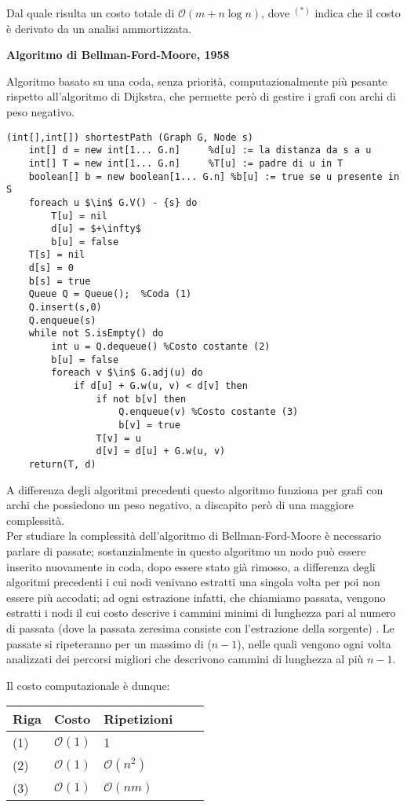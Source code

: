 \documentclass[../cheatSheetAlgoritmi.tex]{subfiles}
\begin{document}
\bigskip
Dal quale risulta un costo totale di $\mathcal{O}(m + n \log n)$, dove $^{(*)}$ indica che il costo è derivato da un analisi ammortizzata.
 
\begin{flushleft}
\textbf{Algoritmo di Bellman-Ford-Moore, 1958}
\end{flushleft}
Algoritmo basato su una coda, senza priorità, computazionalmente più pesante rispetto all'algoritmo di Dijkstra, che permette però di gestire i grafi con archi di peso negativo.
\begin{lstlisting}[caption=Algoritmo di Bellman-Ford-Moore: cammini minimi a sorgente singola]
(int[],int[]) shortestPath (Graph G, Node s)
	int[] d = new int[1... G.n]		%d[u] := la distanza da s a u 
	int[] T = new int[1... G.n]		%T[u] := padre di u in T
	boolean[] b = new boolean[1... G.n]	%b[u] := true se u presente in S 
	foreach u $\in$ G.V() - {s} do
		T[u] = nil
		d[u] = $+\infty$
		b[u] = false
	T[s] = nil
	d[s] = 0
	b[s] = true
	Queue Q = Queue();	%Coda (1)
	Q.insert(s,0)
	Q.enqueue(s)
	while not S.isEmpty() do 
		int u = Q.dequeue()	%Costo costante (2)
		b[u] = false
		foreach v $\in$ G.adj(u) do
			if d[u] + G.w(u, v) < d[v] then 
				if not b[v] then
					Q.enqueue(v) %Costo costante (3)
					b[v] = true
				T[v] = u 
				d[v] = d[u] + G.w(u, v)
	return(T, d)
\end{lstlisting}
A differenza degli algoritmi precedenti questo algoritmo funziona per grafi con archi che possiedono un peso negativo, a discapito però di una maggiore complessità. \\
Per studiare la complessità dell'algoritmo di Bellman-Ford-Moore è necessario parlare di passate; sostanzialmente in questo algoritmo un nodo può essere inserito nuovamente in coda, dopo essere stato già rimosso, a differenza degli algoritmi precedenti i cui nodi venivano estratti una singola volta per poi non essere più accodati; ad ogni estrazione infatti, che chiamiamo passata, vengono estratti i nodi il cui costo descrive i cammini minimi di lunghezza pari al numero di passata (dove la passata zeresima consiste con l'estrazione della sorgente) . Le passate si ripeteranno per un massimo di ($n-1$), nelle quali vengono ogni volta analizzati dei percorsi migliori che descrivono cammini di lunghezza al più $n - 1$. 

\bigskip
Il costo computazionale è dunque:

\bigskip
\begin{tabular}{@{}lllll@{}}
\toprule
Riga & Costo & Ripetizioni &  &  \\ \midrule
(1) & $\mathcal{O}(1)$     & 1           &  &  \\
(2)    & $\mathcal{O}(1)$     & $\mathcal{O}(n^2)$           &  &  \\
(3)    & $\mathcal{O}(1)$     & $\mathcal{O}(nm)$           &  &  \\ \bottomrule
\end{tabular}
\end{document}
